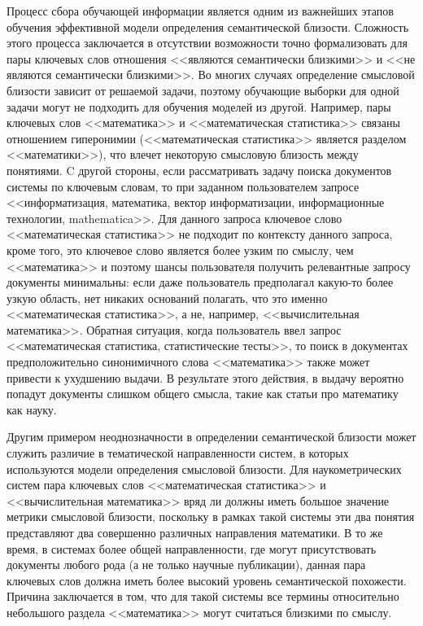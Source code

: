 Процесс сбора обучающей информации является одним из важнейших этапов обучения эффективной модели определения семантической близости. Сложность этого процесса заключается в отсутствии возможности точно формализовать для пары ключевых слов отношения <<являются семантически близкими>> и <<не являются семантически близкими>>. Во многих случаях определение смысловой близости зависит от решаемой задачи, поэтому обучающие выборки для одной задачи могут не подходить для обучения моделей из другой. Например, пары ключевых слов <<математика>> и <<математическая статистика>> связаны отношением гиперонимии (<<математическая статистика>> является разделом <<математики>>), что влечет некоторую смысловую близость между понятиями. C другой стороны, если рассматривать задачу поиска документов системы по ключевым словам, то при заданном пользователем запросе <<информатизация, математика, вектор информатизации, информационные технологии, mathematica>>.  Для данного запроса ключевое слово <<математическая статистика>> не подходит по контексту данного запроса, кроме того, это ключевое слово является более узким по смыслу, чем <<математика>> и поэтому шансы пользователя получить релевантные запросу документы минимальны: если даже пользователь предполагал какую-то более узкую область, нет никаких оснований полагать, что это именно <<математическая статистика>>, а не, например, <<вычислительная математика>>. Обратная ситуация, когда пользователь ввел запрос <<математическая статистика, статистические тесты>>, то поиск в документах предположительно синонимичного слова <<математика>> также может привести к ухудшению выдачи. В результате этого действия, в выдачу вероятно попадут документы слишком общего смысла, такие как статьи про математику как науку.

Другим примером неоднозначности в определении семантической близости может служить различие в тематической направленности систем, в которых используются модели определения смысловой близости. Для наукометрических систем пара ключевых слов <<математическая статистика>> и <<вычислительная математика>> вряд ли должны иметь большое значение метрики смысловой близости, поскольку в рамках такой системы эти два понятия представляют два совершенно различных направления математики. В то же время, в системах более общей направленности, где могут присутствовать документы любого рода (а не только научные публикации), данная пара ключевых слов должна иметь более высокий уровень семантической похожести. Причина заключается в том, что для такой системы все термины относительно небольшого раздела <<математика>> могут считаться близкими по смыслу.

